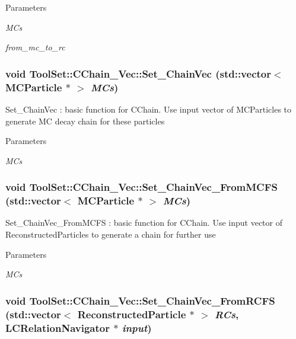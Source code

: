 \begin{DoxyParams}{Parameters}
\item[{\em MCs}]\item[{\em from\_\-mc\_\-to\_\-rc}]\end{DoxyParams}
\hypertarget{classToolSet_1_1CChain__Vec_a855f3bc2ba6a30a7773ed7e8156d1823}{
\subsubsection[{Set\_\-ChainVec}]{\setlength{\rightskip}{0pt plus 5cm}void ToolSet::CChain\_\-Vec::Set\_\-ChainVec (std::vector$<$ MCParticle $\ast$ $>$ {\em MCs})}}
\label{classToolSet_1_1CChain__Vec_a855f3bc2ba6a30a7773ed7e8156d1823}


Set\_\-ChainVec : basic function for CChain. Use input vector of MCParticles to generate MC decay chain for these particles


\begin{DoxyParams}{Parameters}
\item[{\em MCs}]\end{DoxyParams}
\hypertarget{classToolSet_1_1CChain__Vec_a941c5442fabf3407af54076e0d706887}{
\subsubsection[{Set\_\-ChainVec\_\-FromMCFS}]{\setlength{\rightskip}{0pt plus 5cm}void ToolSet::CChain\_\-Vec::Set\_\-ChainVec\_\-FromMCFS (std::vector$<$ MCParticle $\ast$ $>$ {\em MCs})}}
\label{classToolSet_1_1CChain__Vec_a941c5442fabf3407af54076e0d706887}


Set\_\-ChainVec\_\-FromMCFS : basic function for CChain. Use input vector of ReconstructedParticles to generate a chain for further use


\begin{DoxyParams}{Parameters}
\item[{\em MCs}]\end{DoxyParams}
\hypertarget{classToolSet_1_1CChain__Vec_a83e4a3636e16dd58daad83530da96eab}{
\subsubsection[{Set\_\-ChainVec\_\-FromRCFS}]{\setlength{\rightskip}{0pt plus 5cm}void ToolSet::CChain\_\-Vec::Set\_\-ChainVec\_\-FromRCFS (std::vector$<$ ReconstructedParticle $\ast$ $>$ {\em RCs}, \/  LCRelationNavigator $\ast$ {\em input})}}
\label{classToolSet_1_1CChain__Vec_a83e4a3636e16dd58daad83530da96eab}


